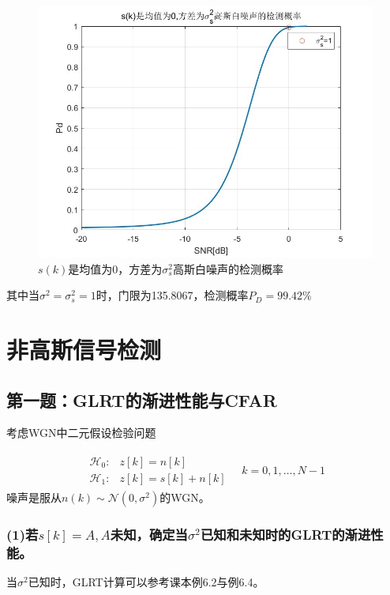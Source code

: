 \documentclass[fontset=windows]{article}
\numberwithin{figure}{section}
\begin{document}
\begin{figure}[H]
	\centering
	\includegraphics[scale=0.6]{fig4.3.jpg}
	\caption{\(s(k)\)是均值为0，方差为\(\sigma^2_s\)高斯白噪声的检测概率}
	\label{4.3}
\end{figure}

其中当\(\sigma^2=\sigma^2_s=1\)时，门限为135.8067，检测概率\(P_D=99.42\%\)

\section{非高斯信号检测}
\subsection{第一题：GLRT的渐进性能与CFAR}
考虑WGN中二元假设检验问题

\begin{align*}
	\begin{matrix}
		\mathcal{H}_0: & z[k]=n[k]      \\
		\mathcal{H}_1: & z[k]=s[k]+n[k]
	\end{matrix}\quad k=0,1,\ldots,N-1
\end{align*}
噪声是服从\(n(k)\sim \mathcal{N}(0,\sigma^2)\)的WGN。

\subsubsection*{(1)若\(s[k]=A,A\)未知，确定当\(\sigma^2\)已知和未知时的GLRT的渐进性能。}

当\(\sigma^2\)已知时，GLRT计算可以参考课本例6.2与例6.4。
\end{document}
